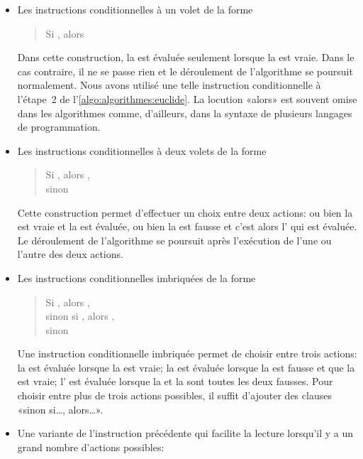 \begin{itemize}
\item Les instructions conditionnelles à un volet de la forme
  \begin{quote}
    Si , alors 
  \end{quote}
  Dans cette construction, la  est évaluée seulement
  lorsque la  est vraie. Dans le cas contraire, il ne
  se passe rien et le déroulement de l'algorithme se poursuit
  normalement. Nous avons utilisé une telle instruction conditionnelle
  à l'étape~2 de l'\autoref{algo:algorithmes:euclide}. La locution
  «alors» est souvent omise dans les algorithmes comme, d'ailleurs,
  dans la syntaxe de plusieurs langages de programmation.
\item Les instructions conditionnelles à deux volets de la forme
  \begin{quote}
    Si , alors , \\
    sinon 
  \end{quote}
  Cette construction permet d'effectuer un choix entre deux actions:
  ou bien la  est vraie et la  est
  évaluée, ou bien la  est fausse et c'est alors
  l' qui est évaluée. Le déroulement de l'algorithme
  se poursuit après l'exécution de l'une ou l'autre des deux actions.
\item Les instructions conditionnelles imbriquées de la forme
  \begin{quote}
    Si , alors , \\
    sinon si , alors , \\
    sinon 
  \end{quote}
  Une instruction conditionnelle imbriquée permet de choisir entre
  trois actions: la  est évaluée lorsque la
   est vraie; la  est évaluée
  lorsque la  est fausse et que la
   est vraie; l' est évaluée
  lorsque la  et la  sont toutes
  les deux fausses. Pour choisir entre plus de trois actions
  possibles, il suffit d'ajouter des clauses «sinon si\dots, alors\dots».
\item Une variante de l'instruction précédente qui facilite la lecture
  lorsqu'il y a un grand nombre d'actions possibles:

\end{itemize}
